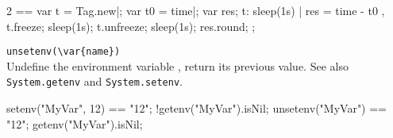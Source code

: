\begin{urbiscriptapi}
\begin{urbiassert}
  2 ==
  {
    var t = Tag.new|;
    var t0 = time|;
    var res;
    t: { sleep(1s) | res = time - t0 },
    t.freeze;
    sleep(1s);
    t.unfreeze;
    sleep(1s);
    res.round;
  };
\end{urbiassert}

\item \lstinline|unsetenv(\var{name})|\\
  Undefine the environment variable , return its previous
  value.  See also \lstinline|System.getenv| and
  \lstinline|System.setenv|.

\begin{urbiassert}
setenv("MyVar", 12) == "12";
!getenv("MyVar").isNil;
unsetenv("MyVar") == "12";
getenv("MyVar").isNil;
\end{urbiassert}


\end{urbiscriptapi}

